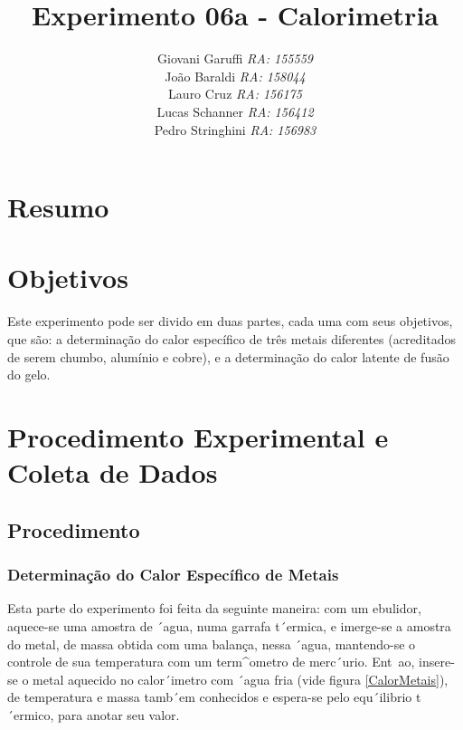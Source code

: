 \documentclass[12pt,a4paper]{article}
\begin{document}
\title{\vspace{70mm}\Huge Experimento 06a - Calorimetria}
\author{ Giovani Garuffi\qquad\hfill
		\textit {RA: 155559}\protect\\
		João Baraldi\hfill
		\textit{RA: 158044}\protect\\
		Lauro Cruz\hfill
		\textit{RA: 156175}\protect\\
		Lucas Schanner\hfill
		\textit{RA: 156412}\protect\\
		Pedro Stringhini\hfill
		\textit {RA: 156983}								
		}
\maketitle
\newpage
\section{Resumo}

\section{Objetivos}
Este experimento pode ser divido em duas partes, cada uma com seus objetivos, que são: a determinação do calor específico de três metais diferentes (acreditados de serem chumbo, alumínio e cobre), e a determinação do calor latente de fusão do gelo. 


\section{Procedimento Experimental e Coleta de Dados}


\subsection{Procedimento}


\subsubsection{Determinação do Calor Específico de Metais}


Esta parte do experimento foi feita da seguinte maneira: com um ebulidor, aquece-se uma amostra de ´agua, numa garrafa t´ermica, e imerge-se a amostra do metal, de massa obtida com uma balança, nessa ´agua, mantendo-se o controle de sua temperatura com um term^ometro de merc´urio. Ent~ao, insere-se o metal aquecido no calor´imetro com ´agua fria (vide figura \ref{CalorMetais}), de temperatura e massa tamb´em conhecidos e espera-se pelo equ´ilibrio t´ermico, para anotar seu valor.
\end{document}
